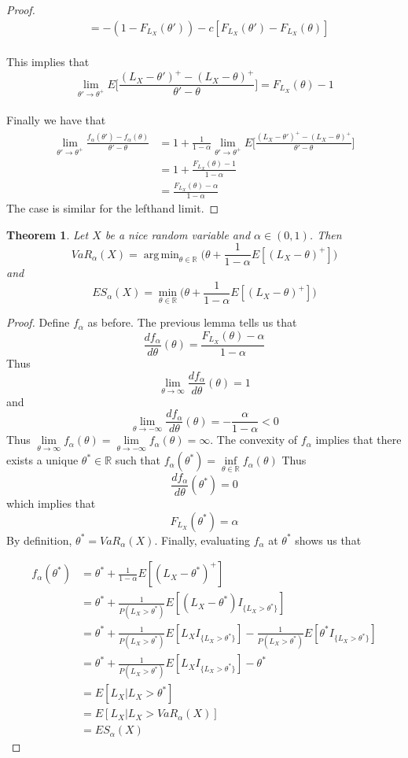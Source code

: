 \documentclass[12pt]{amsart}
\newtheorem{thm}{Theorem}[section]
\newcommand{\al}{\alpha}
\newcommand{\R}{\mathbb{R}}
\DeclareMathOperator*{\argmin}{arg\,min}
\begin{document}
\begin{proof}
\begin{align*}
&= -(1-F_{L_X}(\theta')) -c[F_{L_X}(\theta') - F_{L_X}(\theta)]
\end{align*}\\
This implies that $$\lim_{\theta' \rightarrow \theta^+}E\bigg[ \frac{(L_X - \theta')^+ - (L_X - \theta)^+}{\theta'-\theta} \bigg] = F_{L_X}(\theta) -1$$\\
Finally we have that 
\begin{align*}
\lim_{\theta' \rightarrow \theta^+} \frac{f_\al(\theta') - f_\al(\theta)}{\theta' - \theta} 
&= 1 + \frac{1}{1-\al}\lim_{\theta' \rightarrow \theta^+}E\bigg[ \frac{(L_X - \theta')^+ - (L_X - \theta)^+}{\theta'-\theta} \bigg] \\
&= 1 + \frac{F_{L_X}(\theta) -1}{1-\al}\\
&= \frac{F_{L_X}(\theta) -\al}{1-\al}
\end{align*}
The case is similar for the lefthand limit.

\end{proof}

\begin{thm}
Let $X$ be a nice random variable and $\al\in (0,1)$. Then $$VaR_{\al}(X) = \argmin_{\theta \in \R} \bigg(\theta + \frac{1}{1-\al}E[(L_X - \theta)^+]\bigg)$$ and $$ES_{\al}(X) = \min_{\theta \in \R} \bigg(\theta + \frac{1}{1-\al}E[(L_X - \theta)^+]\bigg)$$
\end{thm}

\begin{proof} 
Define $f_{\alpha}$ as before. The previous lemma tells us that $$\frac{d f_{\al}}{d \theta}(\theta) = \frac{F_{L_X}(\theta) -\al}{1-\al} $$ Thus $$\lim_{\theta \rightarrow \infty}\frac{d f_{\al}}{d \theta}(\theta) = 1$$ and $$\lim_{\theta \rightarrow -\infty} \frac{d f_{\al}}{d \theta}(\theta) = - \frac{\al}{1-\al} <0$$
Thus $\lim\limits_{\theta \rightarrow \infty} f_{\alpha}(\theta) = \lim\limits_{\theta \rightarrow -\infty}f_{\al}(\theta) = \infty$. The convexity of $f_{\al}$ implies that there exists a unique $\theta^* \in \R$ such that $f_{\al}(\theta^*) = \inf\limits_{\theta \in \R}f_{\al}(\theta)$
Thus $$\frac{d f_{\al}}{d \theta}(\theta^*) = 0$$
which implies that $$F_{L_X}(\theta^*) = \al$$
By definition, $\theta^* = VaR_{\al}(X)$. Finally, evaluating $f_{\al}$ at $\theta^*$ shows us that 

\begin{align*}
f_{\al}(\theta^*)  
&=  \theta^* + \frac{1}{1- \al}E[(L_X - \theta^*)^+]\\
& = \theta^* + \frac{1}{P(L_X>\theta^*)}E[(L_X-\theta^*)I_{\{L_X>\theta^*\}}] \\
& = \theta^* + \frac{1}{P(L_X>\theta^*)}E[L_XI_{\{L_X>\theta^*\}}] - \frac{1}{P(L_X>\theta^*)}E[\theta^*I_{\{L_X>\theta^*\}}] \\
& = \theta^* + \frac{1}{P(L_X>\theta^*)}E[L_XI_{\{L_X>\theta^*\}}] - \theta^* \\
&= E[L_X|L_X> \theta^*] \\
& = E[L_X|L_X>VaR_{\al}(X)] \\
& = ES_{\al}(X)
\end{align*}

\end{proof}
\end{document}
